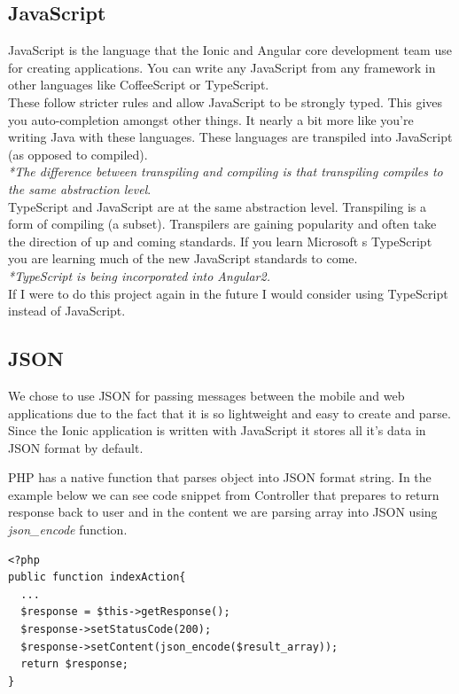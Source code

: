 \subsection{JavaScript}
JavaScript is the language that the Ionic and Angular core development team use for creating applications.
You can write any JavaScript from any framework in other languages like CoffeeScript or TypeScript.
\\

These follow stricter rules and allow JavaScript to be strongly typed.
This gives you auto-completion amongst other things.
It nearly a bit more like you're writing Java with these languages.
These languages are transpiled into JavaScript (as opposed to compiled).
\\
\textit{*The difference between transpiling and compiling is that transpiling compiles to the same abstraction level}.
\\

TypeScript and JavaScript are at the same abstraction level.
Transpiling is a form of compiling (a subset).
Transpilers are gaining popularity and often take the direction of up and coming standards.
If you learn Microsoft s TypeScript you are learning much of the new JavaScript standards to come.
\\
\textit{*TypeScript is being incorporated into Angular2.}
\\

If I were to do this project again in the future I would consider using TypeScript instead of JavaScript.

\subsection{JSON}
We chose to use JSON for passing messages between the mobile and web applications due to the fact that it is so lightweight and easy to create and parse.
Since the Ionic application is written with JavaScript it stores all it's data in JSON format by default.

PHP has a native function that parses object into JSON format string. In the example below we can see code snippet from Controller that prepares to return response back to user and in the content we are parsing array into JSON using \textit{json\_encode} function.
\begin{verbatim}
<?php
public function indexAction{
  ...
  $response = $this->getResponse();
  $response->setStatusCode(200);        
  $response->setContent(json_encode($result_array));        
  return $response;
}
\end{verbatim}
